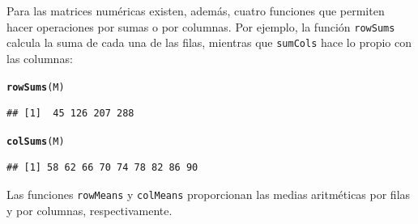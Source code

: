 \documentclass[10pt,a4paper]{article}\usepackage[]{graphicx}\usepackage[]{color}
\makeatletter
\newcommand{\hlstd}[1]{\textcolor[rgb]{0.345,0.345,0.345}{#1}}%
\newcommand{\hlkwd}[1]{\textcolor[rgb]{0.737,0.353,0.396}{\textbf{#1}}}%
\newenvironment{kframe}{%
 \def\at@end@of@kframe{}%
 \ifinner\ifhmode%
  \def\at@end@of@kframe{\end{minipage}}%
  \begin{minipage}{\columnwidth}%
 \fi\fi%
 \def\FrameCommand##1{\hskip\@totalleftmargin \hskip-\fboxsep
 \colorbox{shadecolor}{##1}\hskip-\fboxsep
     \hskip-\linewidth \hskip-\@totalleftmargin \hskip\columnwidth}%
 \MakeFramed {\advance\hsize-\width
   \@totalleftmargin\z@ \linewidth\hsize
   \@setminipage}}%
 {\par\unskip\endMakeFramed%
 \at@end@of@kframe}
\newenvironment{knitrout}{}{} %
\makeatother
\begin{document}
Para las matrices numéricas existen, además, cuatro funciones que permiten hacer operaciones por sumas o por columnas. Por ejemplo, la función {\tt rowSums} calcula la suma de cada una de las filas, mientras que {\tt sumCols} hace lo propio con las columnas:
\begin{knitrout}
\color{fgcolor}\begin{kframe}
\begin{alltt}
    \hlkwd{rowSums}\hlstd{(M)}
\end{alltt}
\begin{verbatim}
## [1]  45 126 207 288
\end{verbatim}
\begin{alltt}
    \hlkwd{colSums}\hlstd{(M)}
\end{alltt}
\begin{verbatim}
## [1] 58 62 66 70 74 78 82 86 90
\end{verbatim}
\end{kframe}
\end{knitrout}
Las funciones {\tt rowMeans} y {\tt colMeans} proporcionan las medias aritméticas por filas y por columnas, respectivamente.
\end{document}
